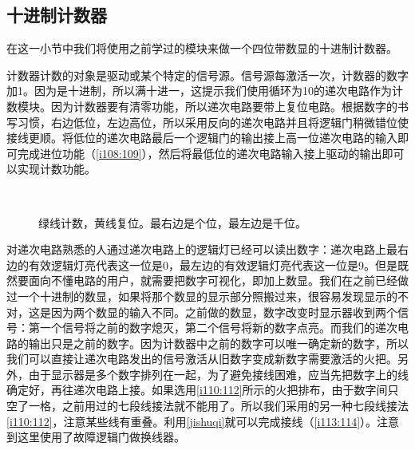 \begin{figure}[!h]
\begin{center}
\qquad
{}
\qquad
{}
\end{center}
\caption{}
\label{i92:97}
\end{figure}

\subsection{十进制计数器}

在这一小节中我们将使用之前学过的模块来做一个四位带数显的十进制计数器。

计数器计数的对象是驱动或某个特定的信号源。信号源每激活一次，计数器的数字加1。因为是十进制，所以满十进一，这提示我们使用循环为10的递次电路作为计数模块。因为计数器要有清零功能，所以递次电路要带上复位电路。根据数字的书写习惯，右边低位，左边高位，所以采用反向的递次电路并且将逻辑门稍微错位使接线更顺。将低位的递次电路最后一个逻辑门的输出接上高一位递次电路的输入即可完成进位功能（\autoref{i108:109}），然后将最低位的递次电路输入接上驱动的输出即可以实现计数功能。

\begin{figure}[!h]
\begin{center}
\\
\end{center}
\caption{绿线计数，黄线复位。最右边是个位，最左边是千位。}
\label{i108:109}
\end{figure}

对递次电路熟悉的人通过递次电路上的逻辑灯已经可以读出数字：递次电路上最右边的有效逻辑灯亮代表这一位是0，最左边的有效逻辑灯亮代表这一位是9。但是既然要面向不懂电路的用户，就需要把数字可视化，即加上数显。我们在之前已经做过一个十进制的数显，如果将那个数显的显示部分照搬过来，很容易发现显示的不对，这是因为两个数显的输入不同。之前做的数显，数字改变时显示器收到两个信号：第一个信号将之前的数字熄灭，第二个信号将新的数字点亮。而我们的递次电路的输出只是之前的数字。因为计数器中之前的数字可以唯一确定新的数字，所以我们可以直接让递次电路发出的信号激活从旧数字变成新数字需要激活的火把。另外，由于显示器是多个数字排列在一起，为了避免接线困难，应当先把数字上的线确定好，再往递次电路上接。如果选用\autoref{i110:112}所示的火把排布，由于数字间只空了一格，之前用过的七段线接法就不能用了。所以我们采用的另一种七段线接法\autoref{i110:112}，注意某些线有重叠。利用\autoref{jishuqi}就可以完成接线（\autoref{i113:114}）。注意到这里使用了故障逻辑门做换线器。

